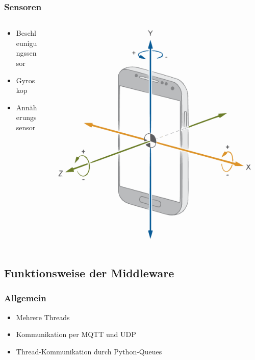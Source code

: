 \documentclass{beamer}
\begin{document}
\begin{frame}
    \frametitle[]{Sensoren}
    \begin{columns}
        \begin{column}{0.5\textwidth}
            \begin{itemize}
                \item Beschleunigungssensor
                \item Gyroskop
                \item Annäherungssensor
            \end{itemize}
        \end{column}
        \begin{column}[]{0.5\textwidth}
            \includegraphics[width=\textwidth]{images/android_axes.pdf}
        \end{column}
    \end{columns}
\end{frame}



\subsection*{Funktionsweise der Middleware}

\begin{frame}
\frametitle[]{Allgemein}
\begin{itemize}
    \item Mehrere Threads
    \item Kommunikation per MQTT und UDP
    \item Thread-Kommunikation durch Python-Queues
\end{itemize}
\end{frame}
\end{document}
